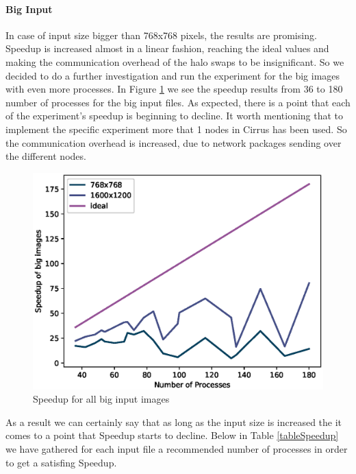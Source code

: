\documentclass[12pt,a4paper]{article}
\begin{document}
          \paragraph{Big Input}
            In case of input size bigger than 768x768 pixels, the results are promising. Speedup is increased almost in a linear fashion, reaching the ideal values and making the communication overhead of the halo swaps to be insignificant. So we decided to do a further investigation and run the experiment for the big images with even more processes. In Figure \ref{speedupBigInput} we see the speedup results from 36 to 180 number of processes for the big input files. As expected, there is a point that each of the experiment's speedup is beginning to decline. It worth mentioning that to implement the specific experiment more that 1 nodes in Cirrus has been used. So the communication overhead is increased, due to network packages sending over the different nodes.

            \begin{figure}[h!]
              \centering
              \includegraphics[scale=0.8]{../graphs/speedupBigInput.eps}
              \caption{Speedup for all big input images}
              \label{speedupBigInput}
            \end{figure}

          As a result we can certainly say that as long as the input size is increased the it comes to a point that Speedup starts to decline. Below in Table \ref{tableSpeedup} we have gathered for each input file a recommended number of processes in order to get a satisfing Speedup.
\end{document}
